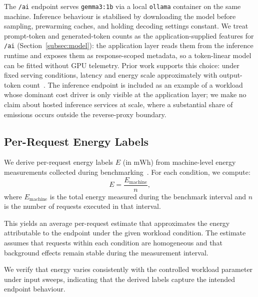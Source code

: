 \documentclass[sigconf]{acmart}
\begin{document}
The \texttt{/ai} endpoint serves \texttt{gemma3:1b} via a local \texttt{ollama} container on the same machine. Inference behaviour is stabilised by downloading the model before sampling, prewarming caches, and holding decoding settings constant. We treat prompt-token and generated-token counts as the application-supplied features for \texttt{/ai} (Section~\ref{subsec:model}): the application layer reads them from the inference runtime and exposes them as response-scoped metadata, so a token-linear model can be fitted without GPU telemetry. Prior work supports this choice: under fixed serving conditions, latency and energy scale approximately with output-token count~\cite{yang2024queueing,poddar2025towards,caravaca2025promptstopower}. The inference endpoint is included as an example of a workload whose dominant cost driver is only visible at the application layer; we make no claim about hosted inference services at scale, where a substantial share of emissions occurs outside the reverse-proxy boundary.

\subsection{Per-Request Energy Labels}

We derive per-request energy labels \(E\) (in \(\mathrm{mWh}\)) from machine-level energy measurements collected during benchmarking~\cite{gmt-run-benchmark-energy}. For each condition, we compute:
\[
E = \frac{E_{\text{machine}}}{n},
\]
where \(E_{\text{machine}}\) is the total energy measured during the benchmark interval and \(n\) is the number of requests executed in that interval.

This yields an average per-request estimate that approximates the energy attributable to the endpoint under the given workload condition. The estimate assumes that requests within each condition are homogeneous and that background effects remain stable during the measurement interval.

We verify that energy varies consistently with the controlled workload parameter under input sweeps, indicating that the derived labels capture the intended endpoint behaviour.
\end{document}

